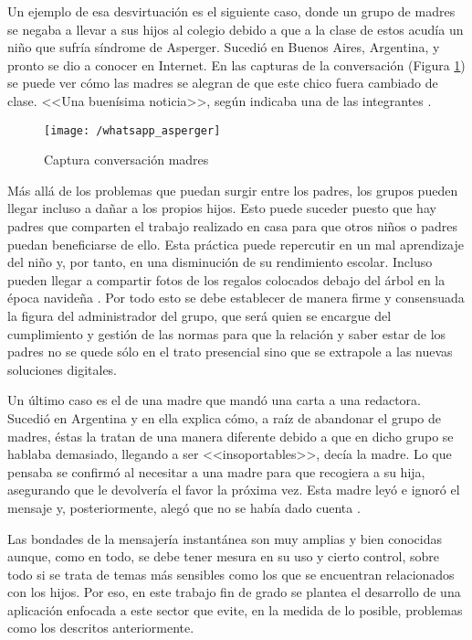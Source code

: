 \newpage

Un ejemplo de esa desvirtuación es el siguiente caso, donde un grupo de madres se negaba a llevar a sus hijos al colegio debido a que a la clase de estos acudía un niño que sufría síndrome de Asperger. Sucedió en Buenos Aires, Argentina, y pronto se dio a conocer en Internet.
En las capturas de la conversación (Figura \ref{fig:whatasper}) se puede ver cómo las madres se alegran de que este chico fuera cambiado de clase. <<Una buenísima noticia>>, según indicaba una de las integrantes \cite{Vanguardia2017}.

\begin{figure}[!h]
	\begin{center}
		\texttt{[image: /whatsapp\_asperger]}
		\caption{Captura conversación madres}
		\label{fig:whatasper}
	\end{center}
\end{figure}

Más allá de los problemas que puedan surgir entre los padres, los grupos pueden llegar incluso a dañar a los propios hijos. Esto puede suceder puesto que hay padres que comparten el trabajo realizado en casa para que otros niños o padres puedan beneficiarse de ello. Esta práctica puede repercutir en un mal aprendizaje del niño y, por tanto, en una disminución de su rendimiento escolar. Incluso pueden llegar a compartir fotos de los regalos colocados debajo del árbol en la época navideña \cite{Alias2017}. Por todo esto se debe establecer de manera firme y consensuada la figura del administrador del grupo, que será quien se encargue del cumplimiento y gestión de las normas para que la relación y saber estar de los padres no se quede sólo en el trato presencial sino que se extrapole a las nuevas soluciones digitales.

Un último caso es el de una madre que mandó una carta a una redactora. Sucedió en Argentina y en ella explica cómo, a raíz de abandonar el grupo de madres, éstas la tratan de una manera diferente debido a que en dicho grupo se hablaba demasiado, llegando a ser <<insoportables>>, decía la madre. Lo que pensaba se confirmó al necesitar a una madre para que recogiera a su hija, asegurando que le devolvería el favor la próxima vez. Esta madre leyó e ignoró el mensaje y, posteriormente, alegó que no se había dado cuenta \cite{Consuelo2017}.

\newpage

Las bondades de la mensajería instantánea son muy amplias y bien conocidas aunque, como en todo, se debe tener mesura en su uso y cierto control, sobre todo si se trata de temas más sensibles como los que se encuentran relacionados con los hijos. Por eso, en este trabajo fin de grado se plantea el desarrollo de una aplicación enfocada a este sector que evite, en la medida de lo posible, problemas como los descritos anteriormente.

